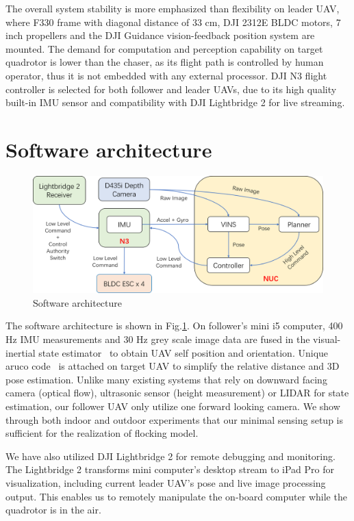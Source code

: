 The overall system stability is more emphasized than flexibility on leader UAV, where F330 frame with diagonal distance of 33 cm, DJI 2312E BLDC motors, 7 inch propellers and the DJI Guidance vision-feedback position system are mounted. The demand for computation and perception capability on target quadrotor is lower than the chaser, as its flight path is controlled by human operator, thus it is not embedded with any external processor. DJI N3 flight controller is selected for both follower and leader UAVs, due to its high quality built-in IMU sensor and compatibility with DJI Lightbridge 2 for live streaming.

\section{Software architecture}\label{software}

\begin{figure}[ht]
  \centering
  \includegraphics[width=1.0\textwidth]{figure/chapter_4/system_diagram.png}
  \caption{Software architecture}
  \label{fig:software_architecture}
\end{figure}

The software architecture is shown in Fig.\ref{fig:software_architecture}. On follower's mini i5 computer, 400 Hz IMU measurements and 30 Hz grey scale image data are fused in the visual-inertial state estimator~\cite{VINS} to obtain UAV self position and orientation. Unique aruco code~\cite{Aruco} is attached on target UAV to simplify the relative distance and 3D pose estimation. Unlike many existing systems that rely on downward facing camera (optical flow), ultrasonic sensor (height measurement) or LIDAR for state estimation, our follower UAV only utilize one forward looking camera. We show through both indoor and outdoor experiments that our minimal sensing setup is sufficient for the realization of flocking model.

We have also utilized DJI Lightbridge 2 for remote debugging and monitoring. The Lightbridge 2 transforms mini computer's desktop stream to iPad Pro for visualization, including current leader UAV's pose and live image processing output. This enables us to remotely manipulate the on-board computer while the quadrotor is in the air.

\newpage
